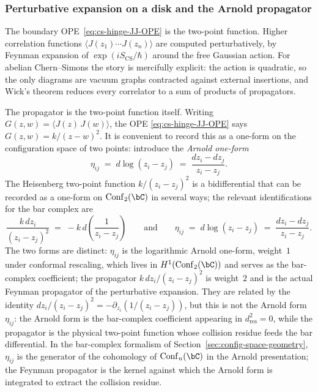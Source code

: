 \subsubsection{Perturbative expansion on a disk and the Arnold
propagator}
\label{sec:cs-hinge-perturbative}

The boundary OPE~\eqref{eq:cs-hinge-JJ-OPE} is the
two-point function. Higher correlation functions
$\langle J(z_1) \cdots J(z_n)\rangle$ are computed perturbatively,
by Feynman expansion of $\exp(iS_{\mathrm{CS}}/\hbar)$ around the
free Gaussian action. For abelian Chern--Simons the story is
mercifully explicit: the action is quadratic, so the only diagrams
are vacuum graphs contracted against external insertions, and
Wick's theorem reduces every correlator to a sum of products of
propagators.

The propagator is the two-point function itself. Writing
$G(z, w) = \langle J(z)\,J(w)\rangle$, the OPE
\eqref{eq:cs-hinge-JJ-OPE} says $G(z, w) = k/(z - w)^2$. It is
convenient to record this as a one-form on the configuration space
of two points: introduce the \emph{Arnold one-form}
\begin{equation}\label{eq:cs-hinge-arnold}
\eta_{ij}
\;=\;
d\log(z_i - z_j)
\;=\;
\frac{dz_i - dz_j}{z_i - z_j}.
\end{equation}
The Heisenberg two-point function $k/(z_i - z_j)^2$ is a
bidifferential that can be recorded as a one-form on
$\mathrm{Conf}_2(\bC)$ in several ways; the relevant
identifications for the bar complex are
\begin{equation}\label{eq:cs-hinge-propagator-forms}
\frac{k\,dz_i}{(z_i - z_j)^2}
\;=\;
-k\,d\!\left(\frac{1}{z_i - z_j}\right)
\qquad\text{and}\qquad
\eta_{ij}
\;=\;
d\log(z_i - z_j)
\;=\;
\frac{dz_i - dz_j}{z_i - z_j}.
\end{equation}
The two forms are distinct: $\eta_{ij}$ is the logarithmic
Arnold one-form, weight~$1$ under conformal rescaling, which
lives in $H^1(\mathrm{Conf}_2(\bC))$ and serves as the
bar-complex coefficient; the propagator
$k\,dz_i/(z_i - z_j)^2$ is weight~$2$ and is the actual Feynman
propagator of the perturbative expansion. They are related by
the identity $dz_i/(z_i - z_j)^2 = -\partial_{z_i}(1/(z_i - z_j))$,
but this is not the Arnold form~$\eta_{ij}$: the Arnold form is
the bar-complex coefficient appearing in
$d_{\mathrm{res}}^2 = 0$, while the propagator is the physical
two-point function whose collision residue feeds the bar
differential. In the bar-complex formalism of
Section~\ref{sec:config-space-geometry},
$\eta_{ij}$ is the generator of the cohomology of
$\mathrm{Conf}_n(\bC)$ in the Arnold presentation; the Feynman
propagator is the kernel against which the Arnold form is
integrated to extract the collision residue.

